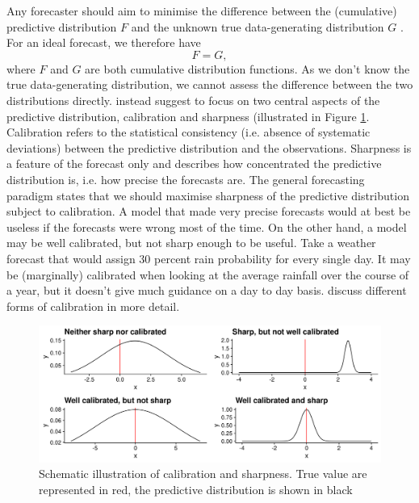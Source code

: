 \documentclass[article,shortnames]{jss}
\begin{document}
Any forecaster should aim to minimise the difference between the (cumulative) predictive distribution $F$ and the unknown true data-generating distribution $G$ \citep{gneitingProbabilisticForecastsCalibration2007}. For an ideal forecast, we therefore have 
%
$$ F = G, $$
%
where $F$ and $G$ are both cumulative distribution functions. As we don't know the true data-generating distribution, we cannot assess the difference between the two distributions directly. \cite{gneitingProbabilisticForecastsCalibration2007} instead suggest to focus on two central aspects of the predictive distribution, calibration and sharpness (illustrated in Figure \ref{fig:forecast-paradigm}. Calibration refers to the statistical consistency (i.e. absence of systematic deviations) between the predictive distribution and the observations. Sharpness is a feature of the forecast only and describes how concentrated the predictive distribution is, i.e. how precise the forecasts are. The general forecasting paradigm states that we should maximise sharpness of the predictive distribution subject to calibration. A model that made very precise forecasts would at best be useless if the forecasts were wrong most of the time. On the other hand, a model may be well calibrated, but not sharp enough to be useful. Take a weather forecast that would assign 30 percent rain probability for every single day. It may be (marginally) calibrated when looking at the average rainfall over the course of a year, but it doesn't give much guidance on a day to day basis. \cite{gneitingProbabilisticForecastsCalibration2007} discuss different forms of calibration in more detail. 

\begin{figure}[h]
\centering
\includegraphics{plots/forecast-paradigm.png}
\caption{\label{fig:forecast-paradigm} Schematic illustration of calibration and sharpness. True value are represented in red, the predictive distribution is shown in black}
\end{figure}
\end{document}
